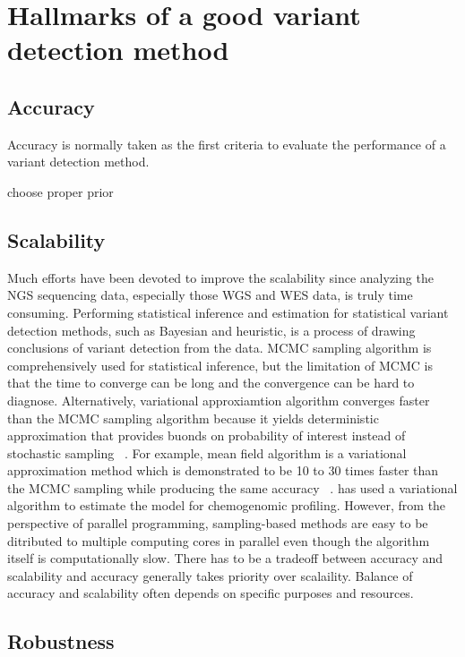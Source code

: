 \documentclass[11pt,reqno]{amsart}
\begin{document}
\section{Hallmarks of a good variant detection method}

\subsection{Accuracy}

Accuracy is normally taken as the first criteria to evaluate the performance of a variant detection method.

choose proper prior 

\subsection{Scalability}

Much efforts have been devoted to improve the scalability since analyzing the NGS sequencing data, especially those WGS and WES data, is truly time consuming.
Performing statistical inference and estimation for statistical variant detection methods, such as Bayesian and heuristic, is a process of drawing conclusions of variant detection from the data. 
MCMC sampling algorithm is comprehensively used for statistical inference, but the limitation of MCMC is that the time to converge can be long and the convergence can be hard to diagnose.
Alternatively, variational approxiamtion algorithm converges faster than the MCMC sampling algorithm because it yields deterministic approximation that provides buonds on probability of interest instead of stochastic sampling ~\citep{jordan1999introduction}.
For example, mean field algorithm is a variational approximation method which is demonstrated to be 10 to 30 times faster than the MCMC sampling while producing the same accuracy ~\citep{peterson1989explorations}.
\citet{flaherty2005latent} has used a variational algorithm to estimate the model for chemogenomic profiling.
However, from the perspective of parallel programming, sampling-based methods are easy to be ditributed to multiple computing cores in parallel even though the algorithm itself is computationally slow.
There has to be a tradeoff between accuracy and scalability and accuracy generally takes priority over scalaility.
Balance of accuracy and scalability often depends on specific purposes and resources.

\subsection{Robustness}
\end{document}

